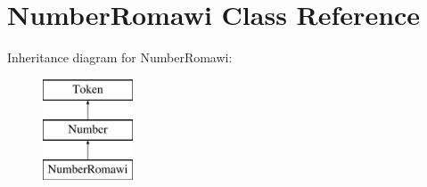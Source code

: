 \hypertarget{class_number_romawi}{}\section{Number\+Romawi Class Reference}
\label{class_number_romawi}
Inheritance diagram for Number\+Romawi\+:\begin{figure}[H]
\begin{center}
\leavevmode
\includegraphics[height=3.000000cm]{class_number_romawi}
\end{center}
\end{figure}
